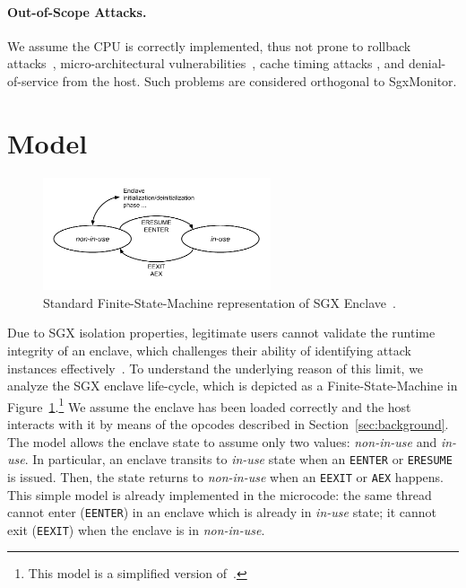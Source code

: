 \paragraph{Out-of-Scope Attacks.}
We assume the CPU is correctly implemented, thus not prone to rollback 
attacks~\citep{197191}, micro-architectural 
vulnerabilities~\citep{7163052,van2017telling,203183,203698,10.1145/3133956.3134038,kocher2019spectre,van2020lvi},
cache timing attacks 
\citep{206170,moghimi2017cachezoom,10.1145/3065913.3065915},
and denial-of-service from the host.
Such problems are considered orthogonal to SgxMonitor.

\section{Model}
\label{sec:model_sgxmonitor}

\begin{figure}[t]
	\centering
	\includegraphics[width=0.6\textwidth]{fig_c6/fmi-standard}
	\caption[Standard SGX FSM.]{Standard Finite-State-Machine representation of 
	SGX Enclave~\citep{costan2016intel}.}
	\label{fig:fmi-standard}
\end{figure}

Due to SGX isolation properties, legitimate users cannot validate the runtime 
integrity of an 
enclave, which challenges their ability of identifying attack instances
effectively~\citep{snakegx,biondo2018guard,lee2017hacking}.
To understand the underlying reason of this limit, we analyze the SGX 
enclave life-cycle, which is depicted as a Finite-State-Machine in 
Figure~\ref{fig:fmi-standard}.\footnote{This model is a simplified version 
of~\cite{costan2016intel}.}
We assume the enclave has been loaded correctly and the host 
interacts with it by means of the opcodes described in 
Section~\ref{sec:background}.
The model allows the enclave state to assume only two values: 
\emph{non-in-use} and \emph{in-use}.
In particular, an enclave transits to \emph{in-use} state when an 
\texttt{EENTER} or \texttt{ERESUME} is issued.
Then, the state returns to \emph{non-in-use} when an \texttt{EEXIT} or  
\texttt{AEX} happens.
This simple model is already implemented in the microcode: the same thread 
cannot enter (\ie \texttt{EENTER}) in an enclave which is 
already in \emph{in-use} state; it cannot exit (\ie \texttt{EEXIT}) when the 
enclave is in \emph{non-in-use}.

